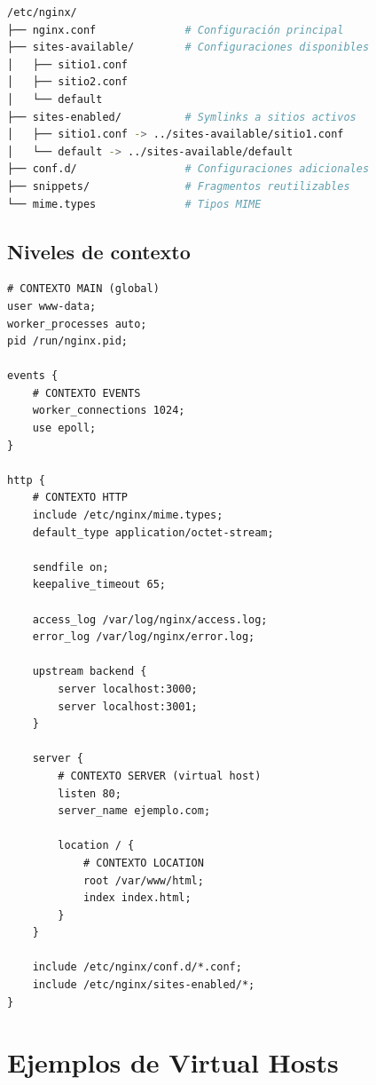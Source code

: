 \documentclass[11pt,a4paper]{article}
\begin{document}
\begin{lstlisting}[language=bash, caption=Estructura de directorios de Nginx]
/etc/nginx/
├── nginx.conf              # Configuración principal
├── sites-available/        # Configuraciones disponibles
│   ├── sitio1.conf
│   ├── sitio2.conf
│   └── default
├── sites-enabled/          # Symlinks a sitios activos
│   ├── sitio1.conf -> ../sites-available/sitio1.conf
│   └── default -> ../sites-available/default
├── conf.d/                 # Configuraciones adicionales
├── snippets/               # Fragmentos reutilizables
└── mime.types              # Tipos MIME
\end{lstlisting}

\subsection{Niveles de contexto}

\begin{lstlisting}[caption=Estructura completa de nginx.conf]
# CONTEXTO MAIN (global)
user www-data;
worker_processes auto;
pid /run/nginx.pid;

events {
    # CONTEXTO EVENTS
    worker_connections 1024;
    use epoll;
}

http {
    # CONTEXTO HTTP
    include /etc/nginx/mime.types;
    default_type application/octet-stream;
    
    sendfile on;
    keepalive_timeout 65;
    
    access_log /var/log/nginx/access.log;
    error_log /var/log/nginx/error.log;
    
    upstream backend {
        server localhost:3000;
        server localhost:3001;
    }
    
    server {
        # CONTEXTO SERVER (virtual host)
        listen 80;
        server_name ejemplo.com;
        
        location / {
            # CONTEXTO LOCATION
            root /var/www/html;
            index index.html;
        }
    }
    
    include /etc/nginx/conf.d/*.conf;
    include /etc/nginx/sites-enabled/*;
}
\end{lstlisting}

\section{Ejemplos de Virtual Hosts}
\end{document}

